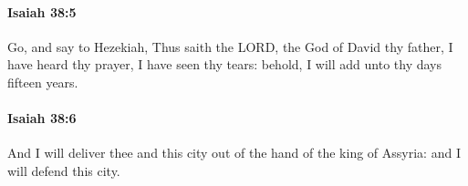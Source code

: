 		\paragraph{Isaiah 38:5} %
			\label{ISAIAH-38-5}

			Go, and say to Hezekiah, Thus saith the LORD, the God of David thy father, I have heard thy prayer, I have seen thy tears: behold, I will add unto thy days fifteen years.


		\paragraph{Isaiah 38:6} %
			\label{ISAIAH-38-6}

			And I will deliver thee and this city out of the hand of the king of Assyria: and I will defend this city.


